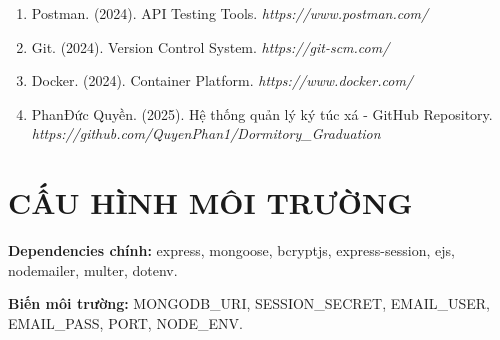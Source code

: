 \documentclass[12pt,a4paper]{article}
\begin{document}
\begin{enumerate}
\item Postman. (2024). API Testing Tools. 
  \textit{https://www.postman.com/}

\item Git. (2024). Version Control System. 
  \textit{https://git-scm.com/}

\item Docker. (2024). Container Platform. 
  \textit{https://www.docker.com/}

\item PhanĐức Quyền. (2025). Hệ thống quản lý ký túc xá - GitHub Repository.
  \textit{https://github.com/QuyenPhan1/Dormitory\_Graduation}

\end{enumerate}

\newpage
\appendix
\section{CẤU HÌNH MÔI TRƯỜNG}

\textbf{Dependencies chính:} express, mongoose, bcryptjs, express-session, ejs, nodemailer, multer, dotenv.

\textbf{Biến môi trường:} MONGODB\_URI, SESSION\_SECRET, EMAIL\_USER, EMAIL\_PASS, PORT, NODE\_ENV.
\end{document}

